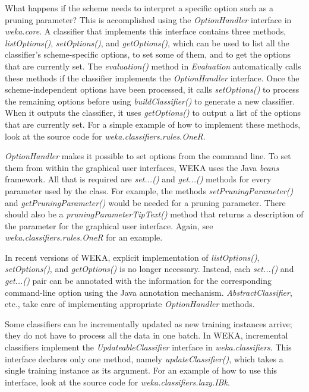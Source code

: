 What happens if the scheme needs to interpret a specific option such
as a pruning parameter? This is accomplished using
the \textit{OptionHandler} interface in {\em weka.core}. A classifier that
implements this interface contains three
methods, \textit{listOptions()}, \textit{setOptions()},
and \textit{getOptions()}, which can be used to list all the
classifier's scheme-specific options, to set some of them, and to get
the options that are currently set. The \textit{evaluation()} method
in \textit{Evaluation} automatically calls these methods if the
classifier implements the \textit{OptionHandler} interface. Once the
scheme-independent options have been processed, it
calls \textit{setOptions()} to process the remaining options before
using \textit{buildClassifier()} to generate a new classifier. When it
outputs the classifier, it uses \textit{getOptions()} to output a list
of the options that are currently set. For a simple example of how to
implement these methods, look at the source code for
\textit{weka.classifiers.rules.OneR}.

\textit{OptionHandler} makes it possible to set options from the command
line. To set them from within the graphical user interfaces, WEKA uses
the Java \textit{beans} framework. All that is required are \textit{set...()} and
\textit{get...()} methods for every parameter used by the class. For example,
the methods \textit{setPruningParameter()} and \textit{getPruningParameter()} would be
needed for a pruning parameter. There should also be a
\textit{pruningParameterTipText()} method that returns a description of the
parameter for the graphical user interface. Again, see
\textit{weka.classifiers.rules.OneR} for an example.

In recent versions of WEKA, explicit implementation of
\textit{listOptions()}, \textit{setOptions()}, and
\textit{getOptions()} is no longer necessary. Instead, each
\textit{set...()} and \textit{get...()} pair can be annotated with the
information for the corresponding command-line option using the Java
annotation mechanism. {\em AbstractClassifier}, etc., take care of
implementing appropriate {\em OptionHandler} methods.

Some classifiers can be incrementally updated as new training
instances arrive; they do not have to process all the data in one
batch. In WEKA, incremental classifiers implement the
\textit{UpdateableClassifier} interface in \textit{weka.classifiers}. This interface
declares only one method, namely \textit{updateClassifier()}, which
takes a single training instance as its argument. For an example of
how to use this interface, look at the source code
for \textit{weka.classifiers.lazy.IBk}.

